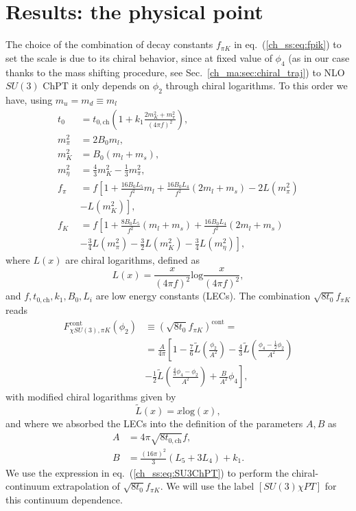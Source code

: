 \section{Results: the physical point}
\label{ch_ss:sec:Results}

The choice of the combination of decay constants $f_{\pi K}$ in eq.~(\ref{ch_ss:eq:fpik}) to set the scale is due to its chiral behavior, since at fixed value of $\phi_4$ (as in our case thanks to the mass shifting procedure, see Sec.~\ref{ch_ma:sec:chiral_traj}) to NLO $SU(3)$ ChPT it only depends on $\phi_2$ through chiral logarithms. To this order we have, using $m_u=m_d\equiv m_l$~\citep{FLAG16,Bar:2013ora}
\begin{align}
\label{ch_ss:eq:t0_chiral}
t_0&=t_{0,\textrm{ch}}\left(1+k_1\frac{2m_K^2+m_{\pi}^2}{(4\pi f)^2}\right), \\
m_{\pi}^2&=2B_0m_l, \\
m_K^2&=B_0(m_l+m_s), \\
m_{\eta}^2&=\frac{4}{3}m_K^2-\frac{1}{3}m_{\pi}^2, \\
f_{\pi}&=f\left[1+\frac{16B_0L_5}{f^2}m_l+\frac{16B_0L_4}{f^2}(2m_l+m_s)-2L(m_{\pi}^2)\right. \\
&\left.-L(m_K^2)\right], \\
f_K&=f\left[1+\frac{8B_0L_5}{f^2}(m_l+m_s)+\frac{16B_0L_4}{f^2}(2m_l+m_s)\right. \\
&\left.-\frac{3}{4}L(m_{\pi}^2)-\frac{3}{2}L(m_K^2)-\frac{3}{4}L(m_{\eta}^2)\right],
\end{align}
where $L(x)$ are chiral logarithms, defined as
\begin{equation}
L(x)=\frac{x}{(4\pi f)^2}\textrm{log}\frac{x}{(4\pi f)^2},
\end{equation}
and $f,t_{0,\textrm{ch}},k_1,B_0,L_i$ are low energy constants (LECs). The combination $\sqrt{8t_0}f_{\pi K}$ reads
\begin{align}
\label{ch_ss:eq:SU3ChPT}
F_{\chi SU(3),\pi K}^{\textrm{cont}}(\phi_2)&\equiv\left(\sqrt{8t_0}f_{\pi K}\right)^{\textrm{cont}}=\\
&=\frac{A}{4\pi}\left[1-\frac{7}{6}\tilde{L}\left(\frac{\phi_2}{A^2}\right)-\frac{4}{3}\tilde{L}\left(\frac{\phi_4-\frac{1}{2}\phi_2}{A^2}\right)\right. \\
&\left.-\frac{1}{2}\tilde{L}\left(\frac{\frac{4}{3}\phi_4-\phi_2}{A^2}\right)+\frac{B}{A^2}\phi_4\right],
\end{align}
with modified chiral logarithms given by
\begin{equation}
\label{ch_ss:eq:log}
\tilde{L}(x)=x{\textrm{log}}\left(x\right),
\end{equation}
and where we absorbed the LECs into the definition of the parameters $A,B$ as
\begin{align}
A&=4\pi\sqrt{8t_{0,\textrm{ch}}}f, \\
B&=\frac{(16\pi)^2}{3}(L_5+3L_4)+k_1.
\end{align} 
We use the expression in eq.~(\ref{ch_ss:eq:SU3ChPT}) to perform the chiral-continuum extrapolation of $\sqrt{8t_0}f_{\pi K}$. We will use the label $[SU(3)\chi PT]$ for this continuum dependence. 

